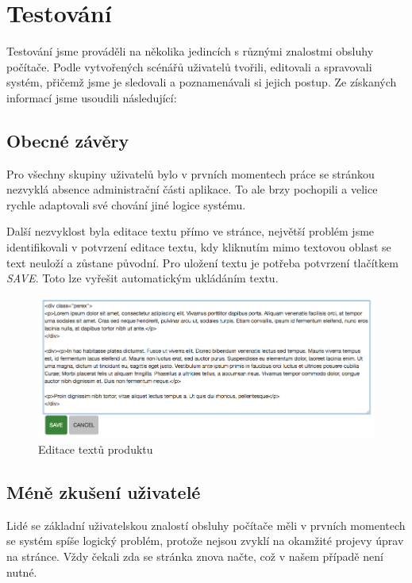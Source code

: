 \documentclass[11pt,a4paper]{article}
\begin{document}

\section*{Testování}
Testování jsme prováděli na několika jedincích s různými znalostmi obsluhy počítače. Podle vytvořených scénářů uživatelů tvořili, editovali a spravovali systém, přičemž jsme je sledovali a poznamenávali si jejich postup. Ze získaných informací jsme usoudili následující:

\subsection*{Obecné závěry}
Pro všechny skupiny uživatelů bylo v prvních momentech práce se stránkou nezvyklá absence administrační části aplikace. To ale brzy pochopili a velice rychle adaptovali své chování jiné logice systému.

Další nezvyklost byla editace textu přímo ve stránce, největší problém jsme identifikovali v potvrzení editace textu, kdy kliknutím mimo textovou oblast se text neuloží a zůstane původní. Pro uložení textu je potřeba potvrzení tlačítkem {\em SAVE}. Toto lze vyřešit automatickým ukládáním textu.

\begin{figure}[h]
    \centering
    \includegraphics[width=\textwidth]{edit.png}
    \caption{Editace textů produktu}
\end{figure}

\subsection*{Méně zkušení uživatelé}
Lidé se základní uživatelskou znalostí obsluhy počítače měli v prvních momentech se systém spíše logický problém, protože nejsou zvyklí na okamžité projevy úprav na stránce. Vždy čekali zda se stránka znova načte, což v našem případě není nutné.
\end{document}
